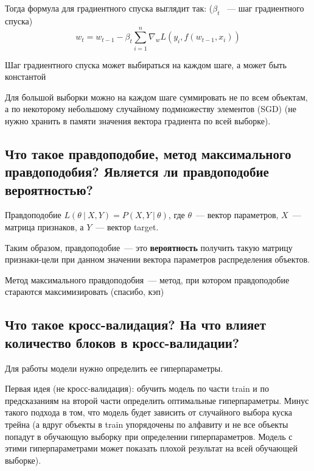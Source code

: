 Тогда формула для градиентного спуска выглядит так: ($\beta_t$ ~--- шаг градиентного спуска)
$$w_t = w_{t-1} - \beta_t\sum\limits_{i=1}^{n} \nabla_wL(y_i, f(w_{t-1}, x_i))$$

\begin{note}
    Шаг градиентного спуска может выбираться на каждом шаге, а может быть константой
\end{note}

\begin{note}
    Для большой выборки можно на каждом шаге суммировать не по всем объектам, а по некоторому небольшому случайному подмножеству элементов (SGD) (не нужно хранить в памяти значения вектора градиента по всей выборке).
\end{note}









\subsection{Что такое правдоподобие, метод максимального правдоподобия? Является ли правдоподобие вероятностью?}

\begin{definition}
    Правдоподобие $L(\theta \ | \ X, Y) = P(X, Y \ | \ \theta)$, где $\theta$~--- вектор параметров, $X$~--- матрица признаков, а $Y$~--- вектор target.
\end{definition}

Таким образом, правдоподобие~--- это \textbf{вероятность} получить такую матрицу признаки-цели при данном значении вектора параметров распределения объектов.

\begin{definition}
    Метод максимального правдоподобия~--- метод, при котором правдоподобие стараются максимизировать (спасибо, кэп)
\end{definition}






\subsection{Что такое кросс-валидация? На что влияет количество блоков в кросс-валидации?}

Для работы модели нужно определить ее гиперпараметры.

Первая идея (не кросс-валидация): обучить модель по части train и по предсказаниям на второй части определить оптимальные гиперпараметры. Минус такого подхода в том, что модель будет зависить от случайного выбора куска трейна (а вдруг объекты в train упорядочены по алфавиту и не все объекты попадут в обучающую выборку при определении гиперпараметров. Модель с этими гиперпараметрами может показать плохой результат на всей обучающей выборке).

